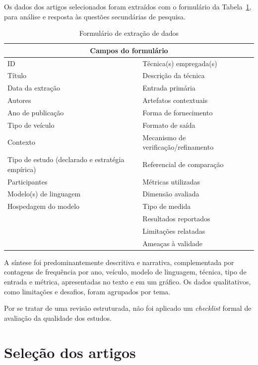 Os dados dos artigos selecionados foram extraídos com o formulário da Tabela~\ref{tab:formulario}, para análise e resposta às questões secundárias de pesquisa.

\begin{table}[H]
  \centering
  \caption{Formulário de extração de dados}
  \label{tab:formulario}
  \small
  \begin{tabular}{|p{}|p{}|}
    \hline
    \multicolumn{2}{|c|}{\textbf{Campos do formulário}} \\ \hline
    ID & Técnica(s) empregada(s) \\
    Título & Descrição da técnica \\
    Data da extração & Entrada primária \\
    Autores & Artefatos contextuais \\
    Ano de publicação & Forma de fornecimento \\
    Tipo de veículo & Formato de saída \\
    Contexto & Mecanismo de verificação/refinamento \\
    Tipo de estudo (declarado e estratégia empírica) & Referencial de comparação \\
    Participantes & Métricas utilizadas \\
    Modelo(s) de linguagem & Dimensão avaliada \\
    Hospedagem do modelo & Tipo de medida \\
     & Resultados reportados \\
     & Limitações relatadas \\
     & Ameaças à validade \\ \hline
  \end{tabular}
\end{table}

A síntese foi predominantemente descritiva e narrativa, complementada por contagens de frequência por ano, veículo, modelo de linguagem, técnica, tipo de entrada e métrica, apresentadas no texto e em um gráfico. Os dados qualitativos, como limitações e desafios, foram agrupados por tema.

Por se tratar de uma revisão estruturada, não foi aplicado um \textit{checklist} formal de avaliação da qualidade dos estudos.

\section{Seleção dos artigos}
\label{sec:selecao}

